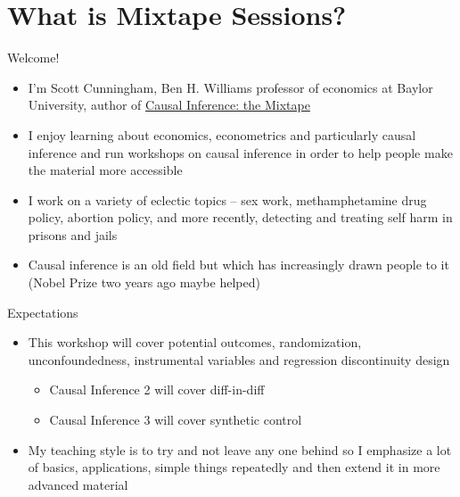 \documentclass{beamer}
\begin{document}





\section{What is Mixtape Sessions?}

\begin{frame}{Welcome!}

  \begin{itemize}
	\item I'm Scott Cunningham, Ben H. Williams professor of economics at Baylor University, author of \underline{Causal Inference: the Mixtape}
	\item I enjoy learning about economics, econometrics and particularly causal inference and run workshops on causal inference in order to help people make the material more accessible
	\item I work on a variety of eclectic topics -- sex work, methamphetamine drug policy, abortion policy, and more recently, detecting and treating self harm in prisons and jails
	\item Causal inference is an old field but which has increasingly drawn people to it (Nobel Prize two years ago maybe helped) 
  \end{itemize}

\end{frame}




\begin{frame}{Expectations}

  \begin{itemize}
    \item This workshop will cover potential outcomes, randomization, unconfoundedness, instrumental variables and regression discontinuity design
    	\begin{itemize}
	\item Causal Inference 2 will cover diff-in-diff
	\item Causal Inference 3 will cover synthetic control
	\end{itemize}
    \item My teaching style is to try and not leave any one behind so I emphasize a lot of basics, applications, simple things repeatedly and then extend it in more advanced material
  \end{itemize}

\end{frame}
\end{document}
